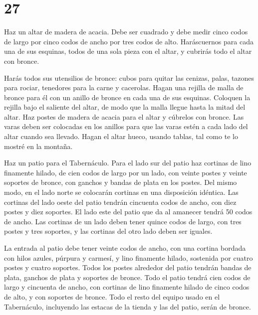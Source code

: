 \hypertarget{section-26}{%
\section{27}\label{section-26}}

 Haz un altar de madera de acacia. Debe ser cuadrado y debe
medir cinco codos de largo por cinco codos de ancho por tres codos de
alto.  Haráscuernos para cada una de sus esquinas, todos de
una sola pieza con el altar, y cubrirás todo el altar con bronce.

 Harás todos sus utensilios de bronce: cubos para quitar las
cenizas, palas, tazones para rociar, tenedores para la carne y
cacerolas.  Hagan una rejilla de malla de bronce para él con
un anillo de bronce en cada una de sus esquinas.  Coloquen
la rejilla bajo el saliente del altar, de modo que la malla llegue hasta
la mitad del altar.  Haz postes de madera de acacia para el
altar y cúbrelos con bronce.  Las varas deben ser colocadas
en los anillos para que las varas estén a cada lado del altar cuando sea
llevado.  Hagan el altar hueco, usando tablas, tal como te
lo mostré en la montaña.

 Haz un patio para el Tabernáculo. Para el lado sur del
patio haz cortinas de lino finamente hilado, de cien codos de largo por
un lado,  con veinte postes y veinte soportes de bronce,
con ganchos y bandas de plata en los postes.  Del mismo
modo, en el lado norte se colocarán cortinas en una disposición
idéntica.  Las cortinas del lado oeste del patio tendrán
cincuenta codos de ancho, con diez postes y diez soportes. 
El lado este del patio que da al amanecer tendrá 50 codos de ancho.
 Las cortinas de un lado deben tener quince codos de largo,
con tres postes y tres soportes,  y las cortinas del otro
lado deben ser iguales.

 La entrada al patio debe tener veinte codos de ancho, con
una cortina bordada con hilos azules, púrpura y carmesí, y lino
finamente hilado, sostenida por cuatro postes y cuatro soportes.
 Todos los postes alrededor del patio tendrán bandas de
plata, ganchos de plata y soportes de bronce.  Todo el
patio tendrá cien codos de largo y cincuenta de ancho, con cortinas de
lino finamente hilado de cinco codos de alto, y con soportes de bronce.
 Todo el resto del equipo usado en el Tabernáculo,
incluyendo las estacas de la tienda y las del patio, serán de bronce.


